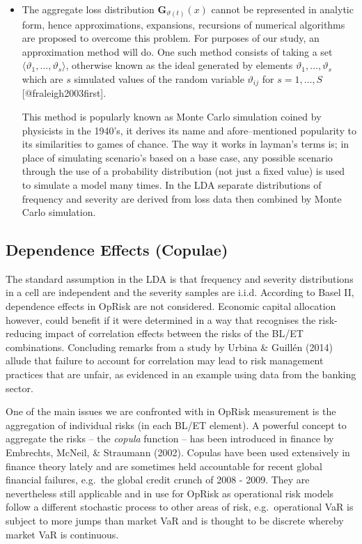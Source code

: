 \documentclass{DissertateUSU}
\begin{document}
\begin{itemize}
\item The aggregate loss distribution \begin{math} \mathbf {G}_{\vartheta(t)}(x) \end{math} cannot be represented in analytic form, hence approximations, expansions, recursions of numerical algorithms are proposed to overcome this problem.  For purposes of our study, an approximation method will do. One such method consists of taking a set \begin{math} \langle \vartheta_1, \ldots , \vartheta_s \rangle \end{math}, otherwise known as the ideal generated by elements \begin{math} \vartheta_1, \ldots , \vartheta_s \end{math} which are $s$ simulated values of the random variable $\vartheta_{ij}$  for $s = 1,\ldots, S$ [@fraleigh2003first].\medskip

This method is popularly known as Monte Carlo simulation coined by physicists in the 1940's, it derives its name and afore--mentioned popularity to its similarities to games of chance. The way it works in layman's terms is; in place of simulating scenario's based on a base case, any possible scenario through the use of a probability distribution (not just a fixed value) is used to simulate a model many times. In the LDA separate distributions of frequency and severity are derived from loss data then combined by Monte Carlo simulation. 
\end{itemize}

\subsection{Dependence Effects (Copulae)}

The standard assumption in the LDA is that frequency and severity
distributions in a cell are independent and the severity samples are
i.i.d. According to Basel II, dependence effects in OpRisk are not
considered. Economic capital allocation however, could benefit if it
were determined in a way that recognises the risk-reducing impact of
correlation effects between the risks of the BL/ET combinations.
Concluding remarks from a study by Urbina \& Guillén (2014) allude that
failure to account for correlation may lead to risk management practices
that are unfair, as evidenced in an example using data from the banking
sector. \medskip

One of the main issues we are confronted with in OpRisk measurement is
the aggregation of individual risks (in each BL/ET element). A powerful
concept to aggregate the risks -- the \emph{copula} function -- has been
introduced in finance by Embrechts, McNeil, \& Straumann (2002). Copulas
have been used extensively in finance theory lately and are sometimes
held accountable for recent global financial failures, e.g.~the global
credit crunch of 2008 - 2009. They are nevertheless still applicable and
in use for OpRisk as operational risk models follow a different
stochastic process to other areas of risk, e.g.~operational VaR is
subject to more jumps than market VaR and is thought to be discrete
whereby market VaR is continuous. \medskip
\end{document}
